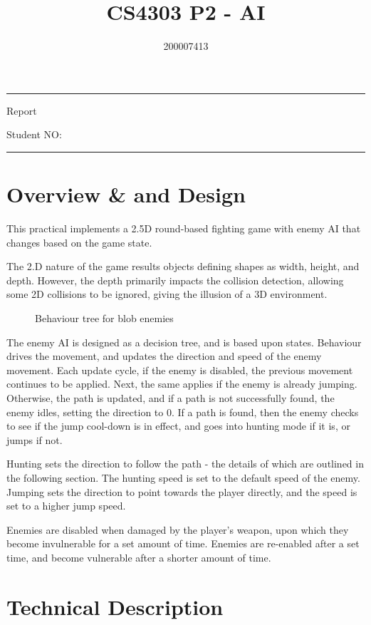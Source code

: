 \documentclass[a4paper, 12pt]{article}
\title{CS4303 P2 - AI}
\author{200007413}
\begin{document}
\hrule
{\huge Report}

{\Huge \thetitle}

{\Large Student NO: \theauthor}
\vspace{1em}\hrule

\section{Overview \& and Design}

This practical implements a 2.5D round-based fighting game with enemy AI that changes based on the game state.

The 2.D nature of the game results objects defining shapes as width, height, and depth. However, the depth primarily impacts the collision detection, allowing some 2D collisions to be ignored, giving the illusion of a 3D environment.

\begin{figure}[H]
  \centering
  
  \caption{Behaviour tree for blob enemies}
  \label{fig:aiBehaviourTree}
\end{figure}

The enemy AI is designed as a decision tree, and is based upon states. Behaviour drives the movement, and updates the direction and speed of the enemy movement. Each update cycle, if the enemy is disabled, the previous movement continues to be applied. Next, the same applies if the enemy is already jumping. Otherwise, the path is updated, and if a path is not successfully found, the enemy idles, setting the direction to 0. If a path is found, then the enemy checks to see if the jump cool-down is in effect, and goes into hunting mode if it is, or jumps if not.

Hunting sets the direction to follow the path - the details of which are outlined in the following section. The hunting speed is set to the default speed of the enemy. Jumping sets the direction to point towards the player directly, and the speed is set to a higher jump speed.

Enemies are disabled when damaged by the player's weapon, upon which they become invulnerable for a set amount of time. Enemies are re-enabled after a set time, and become vulnerable after a shorter amount of time.

\section{Technical Description}
\end{document}

